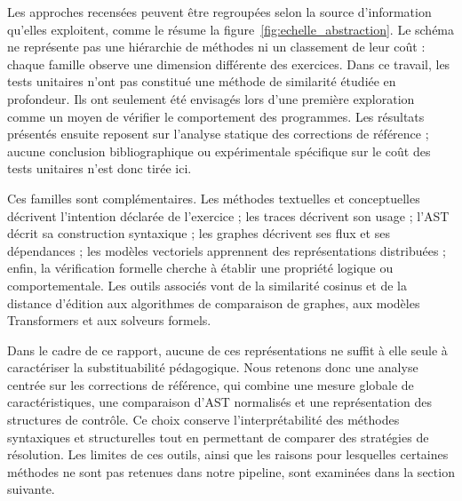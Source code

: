 \documentclass[12pt,a4paper,oneside]{report}
\begin{document}
Les approches recensées peuvent être regroupées selon la source d'information
qu'elles exploitent, comme le résume la figure~\ref{fig:echelle_abstraction}.
Le schéma ne représente pas une hiérarchie de méthodes ni un classement de
leur coût : chaque famille observe une dimension différente des exercices.
Dans ce travail, les tests unitaires n'ont pas constitué une méthode de
similarité étudiée en profondeur. Ils ont seulement été envisagés lors d'une
première exploration comme un moyen de vérifier le comportement des
programmes. Les résultats présentés ensuite reposent sur l'analyse statique
des corrections de référence ; aucune conclusion bibliographique ou
expérimentale spécifique sur le coût des tests unitaires n'est donc tirée ici.

Ces familles sont complémentaires. Les méthodes textuelles et conceptuelles
décrivent l'intention déclarée de l'exercice ; les traces décrivent son usage ;
l'AST décrit sa construction syntaxique ; les graphes décrivent ses flux et
ses dépendances ; les modèles vectoriels apprennent des représentations
distribuées ; enfin, la vérification formelle cherche à établir une propriété
logique ou comportementale. Les outils associés vont de la similarité cosinus
et de la distance d'édition aux algorithmes de comparaison de graphes, aux
modèles Transformers et aux solveurs formels.

Dans le cadre de ce rapport, aucune de ces représentations ne suffit à elle
seule à caractériser la substituabilité pédagogique. Nous retenons donc une
analyse centrée sur les corrections de référence, qui combine une mesure
globale de caractéristiques, une comparaison d'AST normalisés et une
représentation des structures de contrôle. Ce choix conserve
l'interprétabilité des méthodes syntaxiques et structurelles tout en
permettant de comparer des stratégies de résolution. Les limites de ces
outils, ainsi que les raisons pour lesquelles certaines méthodes ne sont pas
retenues dans notre pipeline, sont examinées dans la section suivante.
\end{document}
